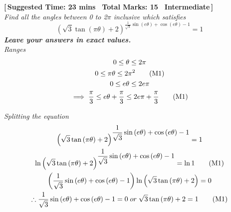\textbf{\hypertarget{P4}{[\,Suggested Time: 23 mins \textbar \, Total Marks: 15 \textbar \, Intermediate\,]}}\\
    \textit{Find all the angles between 0 to 2\(\pi\) inclusive which satisfies}
    \begin{equation*}
    \displaystyle\left(\sqrt{3}\tan{(\pi\theta)}+2\right)^{\displaystyle\frac{1}{\sqrt{3}}\sin{(e\theta)}+\cos{(e\theta)}-1}=1
    \end{equation*}
    \textit{\textbf{Leave your answers in exact values.}} \\




\textit{Ranges}
\begin{gather*}
    0\le\theta\le2\pi \nonumber\\
    0\le\pi\theta\le2\pi^{2} \onemark \\
    0\le e\theta\le2e\pi \nonumber\\
    \implies\frac{\pi}{3}\le e\theta+\frac{\pi}{3}\le2e\pi+\frac{\pi}{3} \onemark \\
\end{gather*}

\textit{Splitting the equation}
\begin{gather*}
    \displaystyle\left(\sqrt{3}\tan{(\pi\theta)}+2\right)^{\displaystyle\frac{1}{\sqrt{3}}\sin{(e\theta)}+\cos{(e\theta)}-1} = 1\\
    \displaystyle\ln\left(\sqrt{3}\tan{(\pi\theta)}+2\right)^{\displaystyle\frac{1}{\sqrt{3}}\sin{(e\theta)}+\cos{(e\theta)}-1} = \ln 1 \onemark \\
    \displaystyle\left(\frac{1}{\sqrt{3}}\sin{(e\theta)}+\cos{(e\theta)}-1\right)\ln\left(\sqrt{3}\tan{(\pi \theta)}+2\right) = 0\\
    \therefore
    \displaystyle\frac{1}{\sqrt{3}}\sin{(e\theta)}+\cos{(e\theta)}-1=0 %
    \; or \;
    \sqrt{3}\tan{(\pi \theta)}+2 = 1 \onemark \\ %
\end{gather*}

